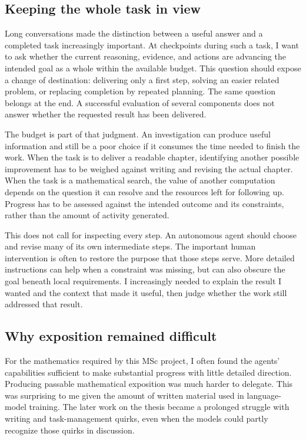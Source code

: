 \subsection{Keeping the whole task in view}

Long conversations made the distinction between a useful answer and a
completed task increasingly important. At checkpoints during such a task, I
want to ask whether the current reasoning, evidence, and actions are advancing
the intended goal as a whole within the available budget. This question should
expose a change of destination: delivering only a first step, solving an easier
related problem, or replacing completion by repeated planning. The same
question belongs at the end. A successful evaluation of several components
does not answer whether the requested result has been delivered.

The budget is part of that judgment. An investigation can produce useful
information and still be a poor choice if it consumes the time needed to
finish the work. When the task is to deliver a readable chapter, identifying
another possible improvement has to be weighed against writing and revising
the actual chapter. When the task is a mathematical search, the value of
another computation depends on the question it can resolve and the resources
left for following up. Progress has to be assessed against the intended
outcome and its constraints, rather than the amount of activity generated.

This does not call for inspecting every step. An autonomous agent should
choose and revise many of its own intermediate steps. The important human
intervention is often to restore the purpose that those steps serve. More
detailed instructions can help when a constraint was missing, but can also
obscure the goal beneath local requirements. I increasingly needed to explain
the result I wanted and the context that made it useful, then judge whether
the work still addressed that result.

\subsection{Why exposition remained difficult}

For the mathematics required by this MSc project, I often found the agents'
capabilities sufficient to make substantial progress with little detailed
direction. Producing passable mathematical exposition was much harder to
delegate. This was surprising to me given the amount of written material
used in language-model training. The later work on the thesis became a
prolonged struggle with writing and task-management quirks, even when the
models could partly recognize those quirks in discussion.

